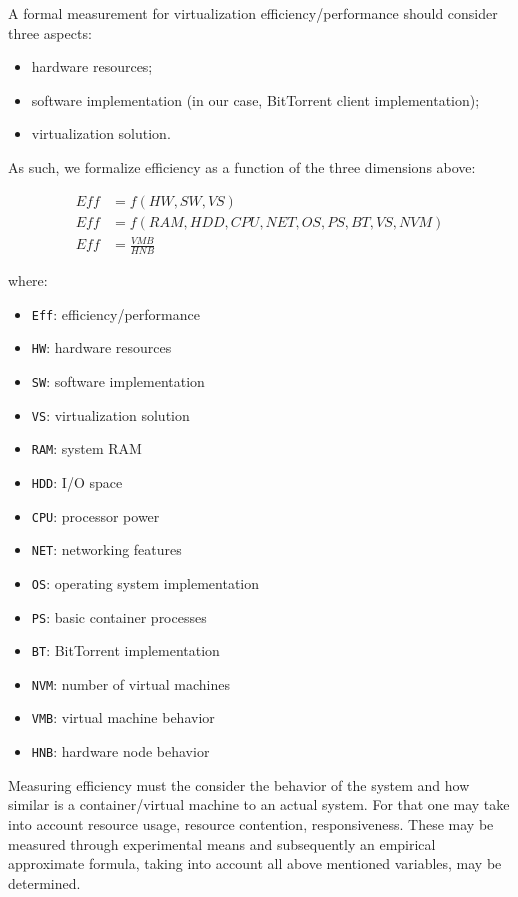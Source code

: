 A formal measurement for virtualization efficiency/performance should consider
three aspects:

\begin{itemize}
  \item hardware resources;
  \item software implementation (in our case, BitTorrent client
  implementation);
  \item virtualization solution.
\end{itemize}

As such, we formalize efficiency as a function of the three dimensions above:

\begin{align}
Eff & = f(HW, SW, VS)\\
Eff & = f(RAM, HDD, CPU, NET, OS, PS, BT, VS, NVM)\\
Eff &= \frac{VMB}{HNB}
\end{align}

where:

\begin{multicols}{2}
    \begin{itemize}
      \item \texttt{Eff}: efficiency/performance
      \item \texttt{HW}: hardware resources
      \item \texttt{SW}: software implementation
      \item \texttt{VS}: virtualization solution
      \item \texttt{RAM}: system RAM
      \item \texttt{HDD}: I/O space
      \item \texttt{CPU}: processor power
      \item \texttt{NET}: networking features
      \item \texttt{OS}: operating system implementation
      \item \texttt{PS}: basic container processes
      \item \texttt{BT}: BitTorrent implementation
      \item \texttt{NVM}: number of virtual machines
      \item \texttt{VMB}: virtual machine behavior
      \item \texttt{HNB}: hardware node behavior
    \end{itemize}
\end{multicols}

Measuring efficiency must the consider the behavior of the system and how
similar is a container/virtual machine to an actual system. For that one may
take into account resource usage, resource contention, responsiveness. These
may be measured through experimental means and subsequently an empirical
approximate formula, taking into account all above mentioned variables, may be
determined.

